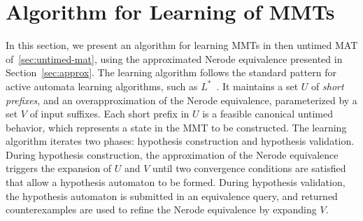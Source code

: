 
\section{Algorithm for Learning of MMTs}
\label{sec:learning}

In this section, we present an algorithm for learning MMTs in then untimed
MAT of~\ref{sec:untimed-mat}, using the approximated Nerode equivalence
presented in Section~\ref{sec:approx}.
The learning algorithm follows the standard pattern for active automata learning
algorithms, such as $L^*$~\cite{Ang87}. It maintains
a set $U$ of {\em short prefixes}, and
  an overapproximation of the Nerode equivalence,
  parameterized by a set $V$ of input suffixes.
Each short prefix in $U$ is a feasible canonical untimed
behavior, which represents a state in the MMT to be constructed.
The learning algorithm iterates two phases: hypothesis construction and
hypothesis validation.
During hypothesis construction,
the approximation of the Nerode equivalence triggers the expansion of
$U$ and $V$ until two convergence conditions are satisfied that allow
a hypothesis automaton to be formed.
During hypothesis validation, the hypothesis automaton is submitted in an
equivalence query, and returned counterexamples are used to refine
the Nerode equivalence by expanding $V$.



